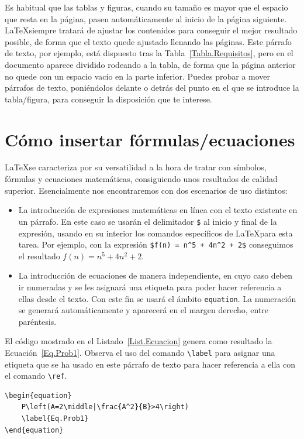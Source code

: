 

Es habitual que las tablas y figuras, cuando su tamaño es mayor que el espacio que resta en la página, pasen automáticamente al inicio de la página siguiente. \LaTeX siempre tratará de ajustar los contenidos para conseguir el mejor resultado posible, de forma que el texto quede ajustado llenando las páginas. Este párrafo de texto, por ejemplo, está dispuesto tras la Tabla~\ref{Tabla.Requisitos}, pero en el documento aparece dividido rodeando a la tabla, de forma que la página anterior no quede con un espacio vacío en la parte inferior. Puedes probar a mover párrafos de texto, poniéndolos delante o detrás del punto en el que se introduce la tabla/figura, para conseguir la disposición que te interese.

\section{Cómo insertar fórmulas/ecuaciones}

\LaTeX se caracteriza por su versatilidad a la hora de tratar con símbolos, fórmulas y ecuaciones matemáticas, consiguiendo unos resultados de calidad superior. Esencialmente nos encontraremos con dos escenarios de uso distintos:

\begin{itemize}
    \item La introducción de expresiones matemáticas en línea con el texto existente en un párrafo. En este caso se usarán el delimitador \texttt{\$} al inicio y final de la expresión, usando en su interior los comandos específicos de \LaTeX para esta tarea. Por ejemplo, con la expresión \verb|$f(n) = n^5 + 4n^2 + 2$| conseguimos el resultado $f(n) = n^5 + 4n^2 + 2$.
    \item La introducción de ecuaciones de manera independiente, en cuyo caso deben ir numeradas y se les asignará una etiqueta para poder hacer referencia a ellas desde el texto. Con este fin se usará el ámbito \verb*|equation|. La numeración se generará automáticamente y aparecerá en el margen derecho, entre paréntesis.
\end{itemize}

El código mostrado en el Listado~\ref{List.Ecuacion} genera como resultado la Ecuación~\ref{Eq.Prob1}. Observa el uso del comando \verb|\label| para asignar una etiqueta que se ha usado en este párrafo de texto para hacer referencia a ella con el comando \verb|\ref|.

\begin{lstlisting}[language={[LaTeX]TeX},caption={Definición de una ecuación},label=List.Ecuacion]
\begin{equation}
    P\left(A=2\middle|\frac{A^2}{B}>4\right)
    \label{Eq.Prob1}
\end{equation}
\end{lstlisting}

